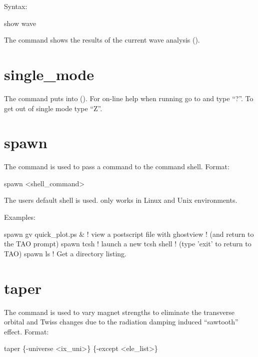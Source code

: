 {{{{{{{{{{Syntax:
\begin{example}
  show wave
\end{example}

The  command shows the results of the current wave analysis ().


\section{single_mode}
\label{s:sing}

The  command puts \tao into  ().  For on-line help
when running \tao go to  and type ``?''.  To get out of single mode type ``Z''.

\section{spawn}
\label{s:spawn}

The  command is used to pass a command to the command shell. Format:
\begin{example}
  spawn <shell_command>
\end{example}

The users default shell is used.  only works in Linux and Unix environments.

Examples:
\begin{example}
  spawn gv quick_plot.ps &      ! view a postscript file with ghostview
                                ! (and return to the TAO prompt)
  spawn tcsh                    ! launch a new tcsh shell 
                                ! (type 'exit' to return to TAO)
  spawn ls                      ! Get a directory listing.
\end{example}


\section{taper}
\label{s:taper}

The  command is used to vary magnet strengths to eliminate the transverse orbital and Twiss
changes due to the radiation damping induced ``sawtooth'' effect. Format:
\begin{example}
  taper \{-universe <ix_uni>\} \{-except <ele_list>\}
\end{example}

}}}}}}}}}}
